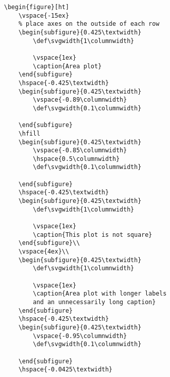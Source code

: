 \documentclass{article}
\begin{document}
\begin{verbatim}
\begin{figure}[ht]
    \vspace{-15ex}
    % place axes on the outside of each row
    \begin{subfigure}{0.425\textwidth}
        \def\svgwidth{1\columnwidth}
        
        \vspace{1ex}
        \caption{Area plot}
    \end{subfigure}
    \hspace{-0.425\textwidth}
    \begin{subfigure}{0.425\textwidth}
        \vspace{-0.89\columnwidth}
        \def\svgwidth{0.1\columnwidth}
        
    \end{subfigure}
    \hfill
    \begin{subfigure}{0.425\textwidth}
        \vspace{-0.85\columnwidth}
        \hspace{0.5\columnwidth}
        \def\svgwidth{0.1\columnwidth}
        
    \end{subfigure}
    \hspace{-0.425\textwidth}
    \begin{subfigure}{0.425\textwidth}
        \def\svgwidth{1\columnwidth}
        
        \vspace{1ex}
        \caption{This plot is not square}
    \end{subfigure}\\
    \vspace{4ex}\\
    \begin{subfigure}{0.425\textwidth}
        \def\svgwidth{1\columnwidth}
        
        \vspace{1ex}
        \caption{Area plot with longer labels
        and an unnecessarily long caption}
    \end{subfigure}
    \hspace{-0.425\textwidth}
    \begin{subfigure}{0.425\textwidth}
        \vspace{-0.95\columnwidth}
        \def\svgwidth{0.1\columnwidth}
        
    \end{subfigure}
    \hspace{-0.0425\textwidth}

\end{verbatim}
\end{document}
